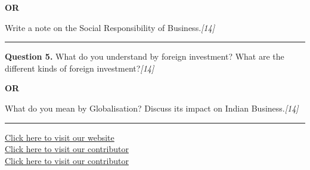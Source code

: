 \documentclass[11pt,a4paper]{article}
\newcommand{\pts}[1]{\hfill   \textit{[#1]}}
\begin{document}
\centerline{   \textbf{OR}}

Write a note on the Social Responsibility of Business.\pts{14}

\medskip\rule{\linewidth}{0.2pt}




\noindent   \textbf{Question 5.}
What do you understand by foreign investment? What are the different kinds of foreign investment?\pts{14}

\centerline{   \textbf{OR}}

What do you mean by Globalisation? Discuss its impact on Indian Business.\pts{14}

\vfill
\rule{\linewidth}{0.4pt}

\begin{center}\small
\href{https://bhu-exam.vercel.app/}{Click here to visit our website}\\[4pt]
\href{https://me-aryan.vercel.app/}{Click here to visit our contributor}\\[4pt]
\href{https://quashan-me.vercel.app/}{Click here to visit our contributor}
\end{center}
\end{document}

